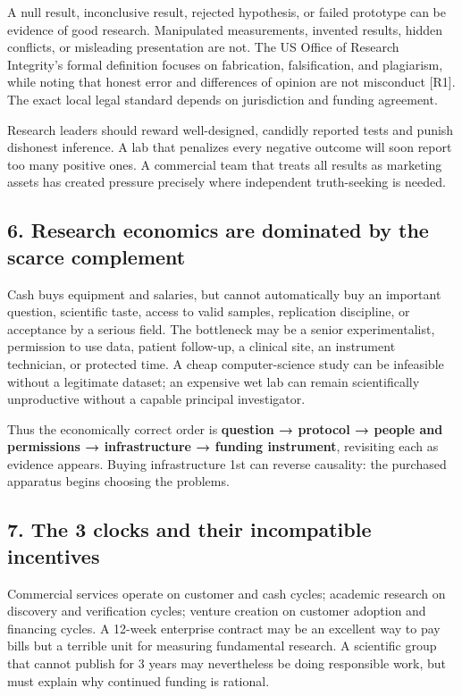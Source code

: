 A null result, inconclusive result, rejected hypothesis, or failed prototype can be evidence of good research. Manipulated measurements, invented results, hidden conflicts, or misleading presentation are not. The US Office of Research Integrity's formal definition focuses on fabrication, falsification, and plagiarism, while noting that honest error and differences of opinion are not misconduct [R1]. The exact local legal standard depends on jurisdiction and funding agreement.

Research leaders should reward well-designed, candidly reported tests and punish dishonest inference. A lab that penalizes every negative outcome will soon report too many positive ones. A commercial team that treats all results as marketing assets has created pressure precisely where independent truth-seeking is needed.

\subsection{6. Research economics are dominated by the scarce complement}

Cash buys equipment and salaries, but cannot automatically buy an important question, scientific taste, access to valid samples, replication discipline, or acceptance by a serious field. The bottleneck may be a senior experimentalist, permission to use data, patient follow-up, a clinical site, an instrument technician, or protected time. A cheap computer-science study can be infeasible without a legitimate dataset; an expensive wet lab can remain scientifically unproductive without a capable principal investigator.

Thus the economically correct order is \textbf{question → protocol → people and permissions → infrastructure → funding instrument}, revisiting each as evidence appears. Buying infrastructure 1st can reverse causality: the purchased apparatus begins choosing the problems.

\subsection{7. The 3 clocks and their incompatible incentives}

Commercial services operate on customer and cash cycles; academic research on discovery and verification cycles; venture creation on customer adoption and financing cycles. A 12-week enterprise contract may be an excellent way to pay bills but a terrible unit for measuring fundamental research. A scientific group that cannot publish for 3 years may nevertheless be doing responsible work, but must explain why continued funding is rational.

